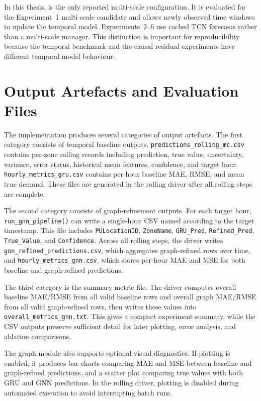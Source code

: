 \documentclass[12pt,a4paper]{report}
\begin{document}
	In this thesis,  is the only reported multi-scale configuration. It is evaluated for the Experiment~1 multi-scale candidate and allows newly observed time windows to update the temporal model. Experiments~2--6 use cached TCN forecasts rather than a multi-scale manager. This distinction is important for reproducibility because the temporal benchmark and the causal residual experiments have different temporal-model behaviour.
	
	\section{Output Artefacts and Evaluation Files}
	
	The implementation produces several categories of output artefacts. The first category consists of temporal baseline outputs. \texttt{predictions\_rolling\_mc.csv} contains per-zone rolling records including prediction, true value, uncertainty, variance, error status, historical mean features, confidence, and target hour. \texttt{hourly\_metrics\_gru.csv} contains per-hour baseline MAE, RMSE, and mean true demand. These files are generated in the rolling driver after all rolling steps are complete.
	
	The second category consists of graph-refinement outputs. For each target hour, \texttt{run\_gnn\_pipeline()} can write a single-hour CSV named according to the target timestamp. This file includes \texttt{PULocationID}, \texttt{ZoneName}, \texttt{GRU\_Pred}, \texttt{Refined\_Pred}, \texttt{True\_Value}, and \texttt{Confidence}. Across all rolling steps, the driver writes \texttt{gnn\_refined\_predictions.csv}, which aggregates graph-refined rows over time, and \texttt{hourly\_metrics\_gnn.csv}, which stores per-hour MAE and MSE for both baseline and graph-refined predictions.
	
	The third category is the summary metric file. The driver computes overall baseline MAE/RMSE from all valid baseline rows and overall graph MAE/RMSE from all valid graph-refined rows, then writes these values into \texttt{overall\_metrics\_gnn.txt}. This gives a compact experiment summary, while the CSV outputs preserve sufficient detail for later plotting, error analysis, and ablation comparisons.
	
	The graph module also supports optional visual diagnostics. If plotting is enabled, it produces bar charts comparing MAE and MSE between baseline and graph-refined predictions, and a scatter plot comparing true values with both GRU and GNN predictions. In the rolling driver, plotting is disabled during automated execution to avoid interrupting batch runs.
	
\end{document}

